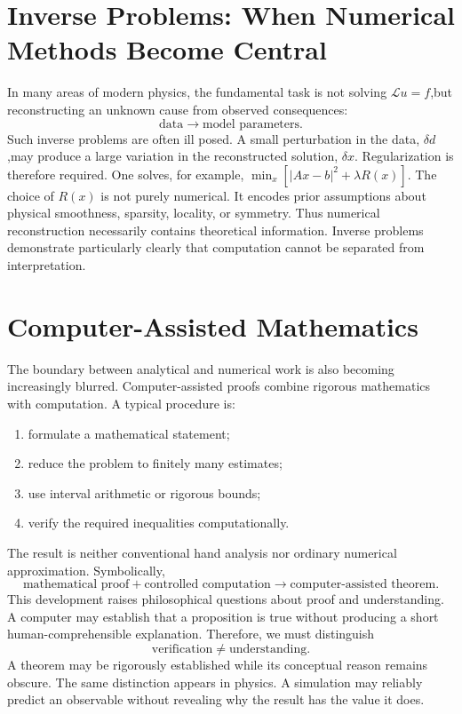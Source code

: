\section{Inverse Problems: When Numerical Methods Become Central}
\label{nm:ip}

In many areas of modern physics, the fundamental task is not solving
$\mathcal{L}u=f$,but reconstructing an unknown cause from observed consequences:
\[\text{data}\rightarrow\text{model parameters}.\]
Such inverse problems are often ill posed.
A small perturbation in the data,
$\delta d$,may produce a large variation in the reconstructed solution,
$\delta x$.
Regularization is therefore required.
One solves, for example,
$\min_x\left[|Ax-b|^2+\lambda R(x)\right]$.
The choice of $R(x)$ is not purely numerical. It encodes prior assumptions
about physical smoothness, sparsity, locality, or symmetry.
Thus numerical reconstruction necessarily contains theoretical information.
Inverse problems demonstrate particularly clearly that computation cannot be
separated from interpretation.

\section{ Computer-Assisted Mathematics}
\label{nm:cm}

The boundary between analytical and numerical work is also becoming increasingly blurred.
Computer-assisted proofs combine rigorous mathematics with computation.
A typical procedure is:
\begin{enumerate}
\item formulate a mathematical statement;
\item reduce the problem to finitely many estimates;
\item use interval arithmetic or rigorous bounds;
\item verify the required inequalities computationally.
\end{enumerate}
The result is neither conventional hand analysis nor ordinary numerical approximation.
Symbolically,
\[
\text{mathematical proof}
+
\text{controlled computation}
\rightarrow
\text{computer-assisted theorem}.
\]
This development raises philosophical questions about proof and understanding.
A computer may establish that a proposition is true without producing a short
human-comprehensible explanation.
Therefore, we must distinguish
\[\text{verification}\neq\text{understanding}.\]
A theorem may be rigorously established while its conceptual reason remains obscure.
The same distinction appears in physics.
A simulation may reliably predict an observable without revealing why the 
result has the value it does.


